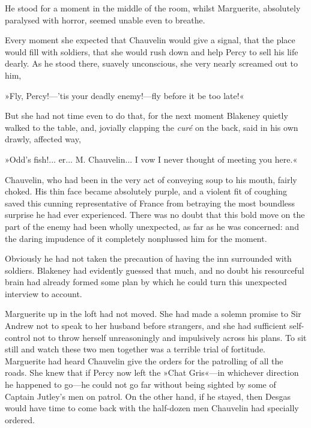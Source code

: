 He stood for a moment in the middle of the room, whilst Marguerite, absolutely paralysed with horror, seemed unable even to breathe.

Every moment she expected that Chauvelin would give a signal, that the place would fill with soldiers, that she would rush down and help Percy to sell his life dearly. As he stood there, suavely unconscious, she very nearly screamed out to him,\longdash


»Fly, Percy!\allowbreak---\allowbreak 'tis your deadly enemy!\allowbreak---\allowbreak fly before it be too late!«

But she had not time even to do that, for the next moment Blakeney quietly walked to the table, and, jovially clapping the \textit{curé} on the back, said in his own drawly, affected way,\longdash


»Odd's fish!... er... M. Chauvelin... I vow I never thought of meeting you here.«

Chauvelin, who had been in the very act of conveying soup to his mouth, fairly choked. His thin face became absolutely purple, and a violent fit of coughing saved this cunning representative of France from betraying the most boundless surprise he had ever experienced. There was no doubt that this bold move on the part of the enemy had been wholly unexpected, as far as he was concerned: and the daring impudence of it completely nonplussed him for the moment.

Obviously he had not taken the precaution of having the inn surrounded with soldiers. Blakeney had evidently guessed that much, and no doubt his resourceful brain had already formed some plan by which he could turn this unexpected interview to account.

Marguerite up in the loft had not moved. She had made a solemn promise to Sir Andrew not to speak to her husband before strangers, and she had sufficient self-control not to throw herself unreasoningly and impulsively across his plans. To sit still and watch these two men together was a terrible trial of fortitude. Marguerite had heard Chauvelin give the orders for the patrolling of all the roads. She knew that if Percy now left the »Chat Gris«\allowbreak---\allowbreak in whichever direction he happened to go\allowbreak---\allowbreak he could not go far without being sighted by some of Captain Jutley's men on patrol. On the other hand, if he stayed, then Desgas would have time to come back with the half-dozen men Chauvelin had specially ordered.

